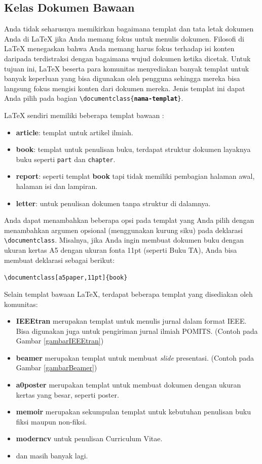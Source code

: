 \documentclass{ta-scientics-matematika-its}
\begin{document}
        \subsection{Kelas Dokumen Bawaan}

        Anda tidak seharusnya memikirkan bagaimana templat dan tata letak dokumen Anda di \LaTeX{} jika Anda memang fokus untuk menulis dokumen. Filosofi di \LaTeX{} menegaskan bahwa Anda memang harus fokus terhadap isi konten daripada terdistraksi dengan bagaimana wujud dokumen ketika dicetak. Untuk tujuan ini, \LaTeX{} beserta para komunitas menyediakan banyak templat untuk banyak keperluan yang bisa digunakan oleh pengguna sehingga mereka bisa langsung fokus mengisi konten dari dokumen mereka. Jenis templat ini dapat Anda pilih pada bagian \texttt{\textbackslash{}documentclass\{\textbf{nama-templat}\}}.

        \LaTeX{} sendiri memiliki beberapa templat bawaan :
        \begin{itemize}
        	\item \textbf{article}: templat untuk artikel ilmiah.
        	\item \textbf{book}: templat untuk penulisan buku, terdapat struktur dokumen layaknya buku seperti \texttt{part} dan \texttt{chapter}.
        	\item \textbf{report}: seperti templat \textbf{book} tapi tidak memiliki pembagian halaman awal, halaman isi dan lampiran.
        	\item \textbf{letter}: untuk penulisan dokumen tanpa struktur di dalamnya.
        \end{itemize}
        Anda dapat menambahkan beberapa opsi pada templat yang Anda pilih dengan menambahkan argumen opsional (menggunakan kurung siku) pada deklarasi \texttt{\textbackslash{}documentclass}. Misalnya, jika Anda ingin membuat dokumen buku dengan ukuran kertas A5 dengan ukuran fonta 11pt (seperti Buku TA), Anda bisa membuat deklarasi sebagai berikut:

        \texttt{\textbackslash{}documentclass[a5paper,11pt]\{book\}}

        Selain templat bawaan \LaTeX, terdapat beberapa templat yang disediakan oleh komunitas:

        \begin{itemize}
        	\item \textbf{IEEEtran} merupakan templat untuk menulis jurnal dalam format IEEE. Bisa digunakan juga untuk pengiriman jurnal ilmiah POMITS. (Contoh pada Gambar \ref{gambarIEEEtran})
        	\item \textbf{beamer} merupakan templat untuk membuat \emph{slide} presentasi. (Contoh pada Gambar \ref{gambarBeamer})
        	\item \textbf{a0poster} merupakan templat untuk membuat dokumen dengan ukuran kertas yang besar, seperti poster.
        	\item \textbf{memoir} merupakan sekumpulan templat untuk kebutuhan penulisan buku fiksi maupun non-fiksi.
        	\item \textbf{moderncv} untuk penulisan Curriculum Vitae.
        	\item dan masih banyak lagi.
        \end{itemize}
\end{document}
